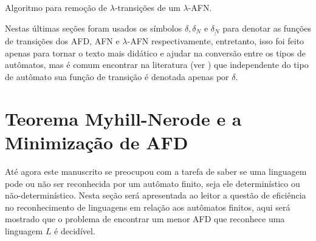 \begin{algorithm}[h]
	\caption{Algoritmo para remoção de $\lambda$-transições de um $\lambda$-AFN.}
	\label{alg:LAFN-AFD}
\end{algorithm}

\begin{note}
	Nestas últimas seções foram usados os símbolos $\delta, \delta_N$ e $\underline{\delta_N}$ para denotar as funções de transições dos AFD, AFN e $\lambda$-AFN respectivamente, entretanto, isso foi feito apenas para tornar o texto mais didático e ajudar na conversão entre os tipos de autômatos, mas é comum encontrar na literatura (ver \cite{benjaLivro2010, hopcroft2008, linz2006}) que independente do tipo de autômato sua função de transição é denotada apenas por $\delta$.
\end{note}

\section{Teorema Myhill-Nerode e a Minimização de AFD}\label{sec:Minimizacao}

Até agora este manuscrito se preocupou com a tarefa de saber se uma linguagem pode ou não ser reconhecida por um autômato finito,  seja ele determinístico ou não-determinístico. Nesta seção será apresentada ao leitor a questão de eficiência no reconhecimento de linguagens em relação aos autômatos finitos, aqui será mostrado que o problema de encontrar um menor AFD que reconhece uma linguagem $L$ é decidível. 

